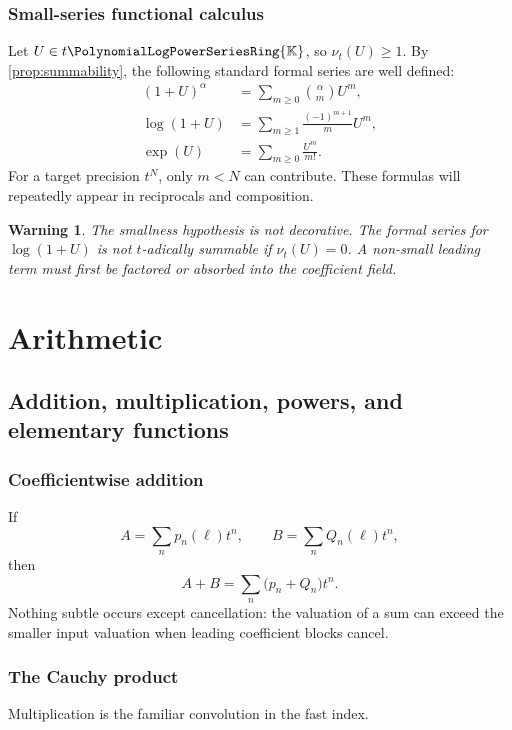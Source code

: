 \documentclass[11pt,oneside,openany]{book}
\newtheorem{warning}[theorem]{Warning}
\newcommand{\K}{\mathbb{K}}
\newcommand{\Rring}{\PolynomialLogPowerSeriesRing{\K}}
\newcommand{\ordt}{\nu_t}
\begin{document}
\section{Small-series functional calculus}
Let \(U\in t\Rring\), so \(\ordt(U)\geq1\).  By
\cref{prop:summability}, the following standard formal series are well defined:
\begin{align}
 (1+U)^\alpha&=\sum_{m\geq0}\binom{\alpha}{m}U^m,
 \label{eq:binomialsmall}\\
 \log(1+U)&=\sum_{m\geq1}\frac{(-1)^{m+1}}{m}U^m,
 \label{eq:logsmall}\\
 \exp(U)&=\sum_{m\geq0}\frac{U^m}{m!}.
 \label{eq:expsmall}
\end{align}
For a target precision \(t^N\), only \(m<N\) can contribute.  These formulas
will repeatedly appear in reciprocals and composition.

\begin{warning}
The smallness hypothesis is not decorative.  The formal series for
\(\log(1+U)\) is not \(t\)-adically summable if \(\ordt(U)=0\).  A non-small
leading term must first be factored or absorbed into the coefficient field.
\end{warning}


\part{Arithmetic}

\chapter{Addition, multiplication, powers, and elementary functions}
\label{ch:multiplication}

\section{Coefficientwise addition}
If
\[
 A=\sum_np_n(\ell)t^n,
 \qquad
 B=\sum_nQ_n(\ell)t^n,
\]
then
\begin{equation}\label{eq:addition}
 A+B=\sum_n\bigl(p_n+Q_n\bigr)t^n.
\end{equation}
Nothing subtle occurs except cancellation: the valuation of a sum can exceed
the smaller input valuation when leading coefficient blocks cancel.

\section{The Cauchy product}
Multiplication is the familiar convolution in the fast index.
\end{document}
